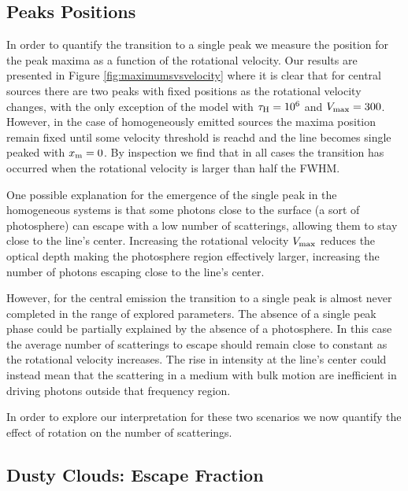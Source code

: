 \documentclass{emulateapj}
\newcommand{\kms}{{\ifmmode{{\mathrm{\,km\ s}^{-1}}}\else{\,km~s$^{-1}$}\fi}}
\begin{document}
\subsection{Peaks Positions}
\label{sec:peaks}

In order to quantify the transition to a single peak we measure the
position for the peak maxima as a function of the rotational
velocity. Our results are presented in Figure
\ref{fig:maximumsvsvelocity} where it is clear that for central
sources there are two peaks with fixed positions as the rotational
velocity changes, with the only exception of the model with $\tau_{\rm
  H}=10^6$ and $V_{\rm max}=300$\kms. However, in the case of
homogeneously emitted sources the maxima position remain fixed until
some velocity threshold is reachd and the line becomes single peaked
with $x_{\rm m}=0$. By inspection we find that in all cases the
transition has occurred when the rotational velocity is larger than
half the FWHM. 

One possible explanation for the emergence of the single peak in the
homogeneous systems is that some photons close to the surface
(a sort of photosphere) can escape with a low number of scatterings,
allowing them to stay close to the line's center. Increasing the
rotational velocity $V_{\rm max}$ reduces the optical depth making the
photosphere region effectively larger, increasing the number of
photons escaping close to the line's center. 

However, for the central emission the transition to a single peak is
almost never completed in the range of explored parameters. The absence
of a single peak phase could be partially explained by the absence of a
photosphere. In this case the average number of scatterings to escape
should remain close to constant as the rotational velocity
increases. The rise in intensity at the line's center could instead
mean that the scattering in a medium with bulk motion are inefficient
in driving photons outside that frequency region.

In order to explore our interpretation for these two scenarios we now 
quantify the effect of rotation on the number of scatterings.




\subsection{Dusty Clouds: Escape Fraction}
\label{sec:escapefraction}
\end{document}
